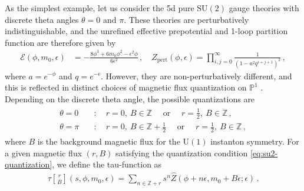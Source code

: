 \documentclass[11pt, a4paper]{article}
\newcommand{\tauftn}[2]{\tau\genfrac[]{0pt}{1}{#1}{#2}}
\theoremstyle{definition}
\begin{document}
As the simplest example, let us consider the 5d pure $ \mathrm{SU}(2) $ gauge theories with discrete theta angles $ \theta=0 $ and $ \pi $. These theories are perturbatively indistinguishable, and the unrefined effective prepotential and 1-loop partition function are therefore given by
\begin{align}
    \mathcal{E}(\phi,m_0,\epsilon) &= -\frac{8\phi^3 + 6m_0 \phi^2 - \epsilon^2\phi}{6\epsilon^2} \, , \quad
    Z_{\mathrm{pert}}(\phi, \epsilon) = \prod_{i,j=0}^\infty \frac{1}{(1-a^2 q^{i+j+1})^2} \, , \label{eq:pure-su2-unref}
\end{align}
where $ a=e^{-\phi} $ and $ q=e^{-\epsilon} $. However, they are non-perturbatively different, and this is reflected in distinct choices of magnetic flux quantization on $ \mathbb{P}^1 $ \cite{Kim:2020hhh}. Depending on the discrete theta angle, the possible quantizations are 
\begin{align}
    \begin{aligned}\label{eq:su2-quantization}
        \theta = 0 \quad &: \quad r=0 , \ B \in \mathbb{Z} \quad \text{ or } \quad r=\frac{1}{2}, \ B \in \mathbb{Z} \, , \\
        \theta = \pi \quad &: \quad r = 0 , \ B \in \mathbb{Z}+\frac{1}{2} \quad \text{ or } \quad r = \frac{1}{2} , \ B \in \mathbb{Z} \, ,
    \end{aligned}
\end{align}
where $ B $ is the background magnetic flux for the $ \mathrm{U}(1) $ instanton symmetry. For a given magnetic flux $ (r, B) $ satisfying the quantization condition \eqref{eq:su2-quantization}, we define the tau-function as
\begin{align}
    \tauftn{r}{B}(s, \phi, m_0, \epsilon)
    = \sum_{n \in \mathbb{Z}+r} s^n \hat{Z}(\phi+n\epsilon, m_0+B \epsilon; \epsilon) \, .
\end{align}
\end{document}
